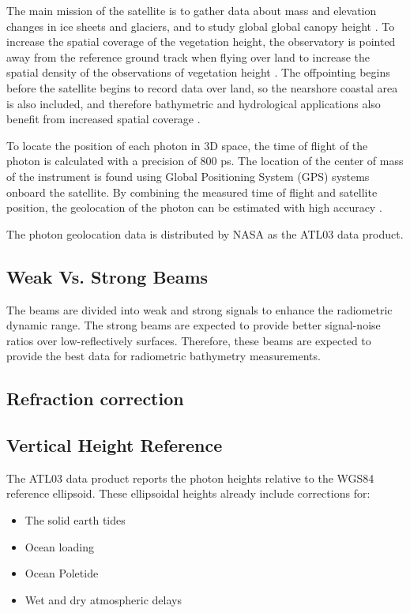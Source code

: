 The main mission of the satellite is to gather data about mass and elevation changes in ice sheets and glaciers, and to study global global canopy height \parencite{Markus2017}. To increase the spatial coverage of the vegetation height, the observatory is pointed away from the reference ground track when flying over land to increase the spatial density of the observations of vegetation height \parencite{Markus2017}. The offpointing begins before the satellite begins to record data over land, so the nearshore coastal area is also included, and therefore bathymetric and hydrological applications also benefit from increased spatial coverage \parencite{Magruder2021}.

To locate the position of each photon in 3D space, the time of flight of the photon is calculated with a precision of 800 ps\parencite{Neumann2019d}. The location of the center of mass of the instrument is found using Global Positioning System (GPS) systems onboard the satellite. By combining the measured time of flight and satellite position, the geolocation of the photon can be estimated with high accuracy \parencite{Neumann2019d}.

The photon geolocation data is distributed by NASA as the ATL03 data product.

\subsection{Weak Vs. Strong Beams}

The beams are divided into weak and strong signals to enhance the radiometric dynamic range. The strong beams are expected to provide better signal-noise ratios over low-reflectively surfaces.\parencite{Neumann2019d} Therefore, these beams are expected to provide the best data for radiometric bathymetry measurements.

\subsection{Refraction correction}


\subsection{Vertical Height Reference}
The ATL03 data product reports the photon heights relative to the WGS84 reference ellipsoid. These ellipsoidal heights already include corrections for:

\begin{itemize}
      \item The solid earth tides 
      \item Ocean loading 
      \item Ocean Poletide 
      \item Wet and dry atmospheric delays
\end{itemize}
 
